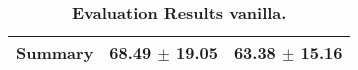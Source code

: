 \begin{table}[htb]
{\begin{tabular}{lll}
\midrule
\textbf{Summary                                  } &                  \phantom{0}68.49 $\pm$ 19.05 &                      \phantom{0}63.38 $\pm$ 15.16 \\
\bottomrule
\end{tabular}%
}
\caption{\textbf{Evaluation Results vanilla.}}
\label{tab:eval-results}
\end{table}
